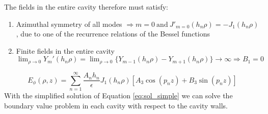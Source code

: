 The fields in the entire cavity therefore must satisfy:
\begin{enumerate}
\item Azimuthal symmetry of all modes $\Rightarrow m=0 \ \text{and}\ J'_{m=0}(h_n\rho)=-J_1(h_n\rho)$, due to one of the recurrence relations of the Bessel functions
\item Finite fields in the entire cavity $\lim_{\rho\rightarrow 0}Y_m'(h_n\rho)=\lim_{\rho\rightarrow 0}\{Y_{m-1}(h_n\rho)-Y_{m+1}(h_n\rho)\}\rightarrow \infty \Rightarrow B_1=0$
\end{enumerate}
\begin{equation}\label{eq:sol_simple}
E_{\phi}(\rho,z)=\sum\limits_{n=1}^{\infty} \frac{A_nh_n}{\epsilon}J_1(h_n\rho)[A_3\cos(p_nz)+B_3\sin(p_nz)]
\end{equation}
With the simplified solution of Equation \eqref{eq:sol_simple} we can solve the boundary value problem in each cavity with respect to the cavity walls.

